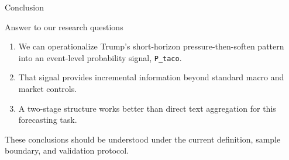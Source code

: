 \begin{frame}{Conclusion}
  \begin{block}{Answer to our research questions}
    \begin{enumerate}
      \item We can operationalize Trump's short-horizon pressure-then-soften pattern into an event-level probability signal, \texttt{P\_taco}.
      \item That signal provides incremental information beyond standard macro and market controls.
      \item A two-stage structure works better than direct text aggregation for this forecasting task.
    \end{enumerate}
  \end{block}

  \small
  These conclusions should be understood under the current definition, sample boundary, and validation protocol.
\end{frame}
